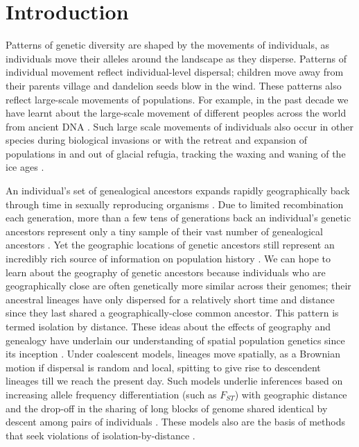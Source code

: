 \documentclass[12pt]{article}
\begin{document}
\section*{Introduction}

Patterns of genetic diversity are shaped by the movements of individuals, as individuals move their alleles around the landscape as they disperse. Patterns of individual movement reflect individual-level dispersal; children move away from their parents village and dandelion seeds blow in the wind. These patterns also reflect large-scale movements of populations. 
For example, in the past decade we have learnt about the large-scale movement of different peoples across the world from ancient DNA \citep{slatkin2016ancient,reich2018we}. 
Such large scale movements of individuals also occur in other species during biological invasions or with the retreat and expansion of populations in and out of glacial refugia, tracking the waxing and waning of the ice ages \citep{hewitt2000genetic}.

An individual's set of genealogical ancestors expands rapidly geographically back through time in sexually reproducing organisms \citep{KELLEHER20161,Coop_where_genetic}. 
Due to limited recombination each generation, more than a few tens of generations back an individual's genetic ancestors represent only a tiny sample of their vast number of genealogical ancestors \citep{donnelly1983probability,Coop_many_genetic}. 
Yet the geographic locations of genetic ancestors still represent an incredibly rich source of information on population history \citep{bradburd2019spatial}. We can hope to learn about the geography of genetic ancestors because individuals who are geographically close are often genetically more similar across their genomes; their ancestral lineages have only dispersed for a relatively short time and distance since they last shared a geographically-close common ancestor. 
This pattern is termed isolation by distance. 
These ideas about the effects of geography and genealogy have underlain our understanding of spatial population genetics since its inception  \citep{wright1943isolation,malecot1948mathematics}. 
Under coalescent models, lineages move spatially, as a Brownian motion if dispersal is random and local, spitting to give rise to descendent lineages till we reach the present day. 
Such models underlie inferences based on increasing allele frequency differentiation (such as $F_{ST}$) with geographic distance \citep{rousset1997genetic} and the drop-off in the sharing of long blocks of genome shared identical by descent among pairs of individuals \citep{ralph2013geography,ringbauer2017inferring}. 
These models also are the basis of methods that seek violations of isolation-by-distance \citep{wang2014isolation}.
\end{document}
